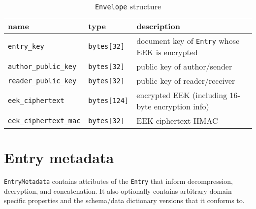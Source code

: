 \documentclass[10pt]{article}
\newcommand{\ttt}[1]{\texttt{#1}}
\def\Entry{\ttt{Entry}}
\def\Envelope{\ttt{Envelope}}
\begin{document}
\begin{appendices}
\begin{table}[htbp]
	\caption*{\Envelope{} structure}
	\begin{small}
	\begin{tabular}{lll}
		\toprule
		name & type  & description \\ \midrule
		\ttt{entry\_key} & \ttt{bytes[32]} & document key of \Entry{} whose EEK is encrypted \\
		\ttt{author\_public\_key} & \ttt{bytes[32]} & public key of author/sender \\
		\ttt{reader\_public\_key} & \ttt{bytes[32]} & public key of reader/receiver \\
		\ttt{eek\_ciphertext}  & \ttt{bytes[124]} & encrypted EEK (including 16-byte encryption info) \\
		\ttt{eek\_ciphertext\_mac} & \ttt{bytes[32]} & EEK ciphertext HMAC \\
		\bottomrule
	\end{tabular}
	\end{small}
\end{table}

\pagebreak

\section{Entry metadata}
\label{app:entry-meta}

\ttt{EntryMetadata} contains attributes of the \Entry{} that inform decompression, decryption, and concatenation. It also optionally contains arbitrary domain-specific properties and the schema/data dictionary versions that it conforms to.


\end{appendices}
\end{document}
